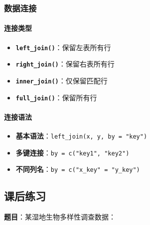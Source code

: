 \documentclass[
  twoside]{book}
\providecommand{\tightlist}{%
  \setlength{\itemsep}{0pt}\setlength{\parskip}{0pt}}
\begin{document}
\hypertarget{ux6570ux636eux8fdeux63a5-1}{%
\subsubsection{数据连接}\label{ux6570ux636eux8fdeux63a5-1}}

\hypertarget{ux8fdeux63a5ux7c7bux578b}{%
\paragraph{连接类型}\label{ux8fdeux63a5ux7c7bux578b}}

\begin{itemize}
\tightlist
\item
  \textbf{\texttt{left\_join()}}：保留左表所有行
\item
  \textbf{\texttt{right\_join()}}：保留右表所有行
\item
  \textbf{\texttt{inner\_join()}}：仅保留匹配行
\item
  \textbf{\texttt{full\_join()}}：保留所有行
\end{itemize}

\hypertarget{ux8fdeux63a5ux8bedux6cd5}{%
\paragraph{连接语法}\label{ux8fdeux63a5ux8bedux6cd5}}

\begin{itemize}
\tightlist
\item
  \textbf{基本语法}：\texttt{left\_join(x,\ y,\ by\ =\ "key")}
\item
  \textbf{多键连接}：\texttt{by\ =\ c("key1",\ "key2")}
\item
  \textbf{不同列名}：\texttt{by\ =\ c("x\_key"\ =\ "y\_key")}
\end{itemize}

\hypertarget{ux8bfeux540eux7ec3ux4e60-8}{%
\subsection{课后练习}\label{ux8bfeux540eux7ec3ux4e60-8}}

\textbf{题目}：某湿地生物多样性调查数据：
\end{document}

